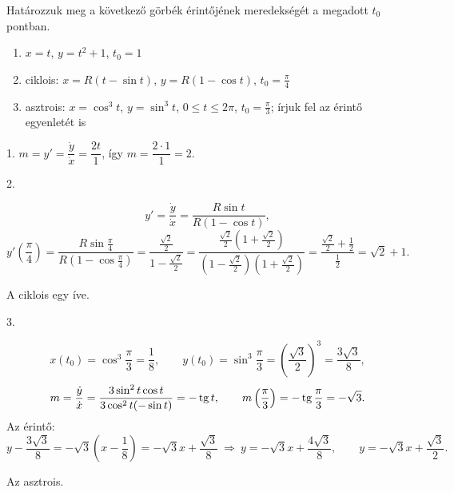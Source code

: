 \documentclass[11pt]{article}
\begin{document}
\begin{exbox}
\begin{example}
Határozzuk meg a következő görbék érintőjének meredekségét a megadott $t_{0}$ pontban.
\begin{enumerate}[label=\arabic*., itemsep=2pt]
\item $x=t$, $y=t^{2}+1$, $t_{0}=1$
\item ciklois: $x=R(t-\sin t)$, $y=R(1-\cos t)$, $t_{0}=\frac{\pi}{4}$
\item asztrois: $x=\cos^{3}t$, $y=\sin^{3}t$, $0\le t\le 2\pi$, $t_{0}=\frac{\pi}{3}$; írjuk fel az érintő egyenletét is
\end{enumerate}
\end{example}
\end{exbox}
\begin{solution}
1. $m=y'=\dfrac{\dot y}{\dot x}=\dfrac{2t}{1}$, így $m=\dfrac{2\cdot 1}{1}=2$.

2.

\[
y'=\frac{\dot y}{\dot x}=\frac{R\sin t}{R(1-\cos t)},
\]
\[
y'\left(\frac{\pi}{4}\right)=\frac{R\sin\frac{\pi}{4}}{R\left(1-\cos\frac{\pi}{4}\right)}
=\frac{\frac{\sqrt{2}}{2}}{1-\frac{\sqrt{2}}{2}}
=\frac{\frac{\sqrt{2}}{2}\left(1+\frac{\sqrt{2}}{2}\right)}{\left(1-\frac{\sqrt{2}}{2}\right)\left(1+\frac{\sqrt{2}}{2}\right)}
=\frac{\frac{\sqrt{2}}{2}+\frac{1}{2}}{\frac{1}{2}}=\sqrt{2}+1 .
\]

\begin{notefig}{A ciklois egy íve.}
\end{notefig}

3.

\[
x(t_{0})=\cos^{3}\frac{\pi}{3}=\frac{1}{8},\qquad y(t_{0})=\sin^{3}\frac{\pi}{3}=\left(\frac{\sqrt{3}}{2}\right)^{3}=\frac{3\sqrt{3}}{8},
\]
\[
m=\frac{\dot y}{\dot x}=\frac{3\sin^{2}t\cos t}{3\cos^{2}t(-\sin t)}=-\operatorname{tg} t,\qquad m\left(\frac{\pi}{3}\right)=-\operatorname{tg}\frac{\pi}{3}=-\sqrt{3}.
\]
Az érintő:
\[
y-\frac{3\sqrt{3}}{8}=-\sqrt{3}\left(x-\frac{1}{8}\right)=-\sqrt{3}x+\frac{\sqrt{3}}{8}
\ \Longrightarrow\ y=-\sqrt{3}x+\frac{4\sqrt{3}}{8},\qquad y=-\sqrt{3}x+\frac{\sqrt{3}}{2}.
\]

\begin{notefig}{Az asztrois.}
\end{notefig}
\end{solution}
\end{document}
